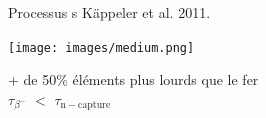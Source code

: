 \documentclass[10pt]{beamer}
\subtitle{Étude de spectres infrarouges de géantes rouges évoluées}
\date{}
\author{\small Margaux Vandererven}
\institute{\small Supervisé par Sophie Van Eck}
\begin{document}
\maketitle

\begin{frame}[fragile]{Processus s}
    \footnotesize{Käppeler et al. 2011.}

    \begin{center}
        \texttt{[image: images/medium.png]} \\
        \end{center}
        \vfill
        \begin{center}
        + de 50\% éléments plus lourds que le fer \\
        $\tau_{\beta^-}$ $<$ $\tau_{\mathrm{n-capture}}$
    \end{center}
\end{frame}
\end{document}
